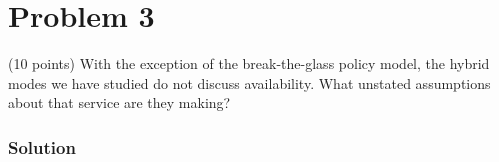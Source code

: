 \section*{Problem 3}

(10 points) With the exception of the break-the-glass policy model, the hybrid modes we have studied do not discuss availability. What unstated assumptions about that service are they making?

\subsubsection*{Solution}
